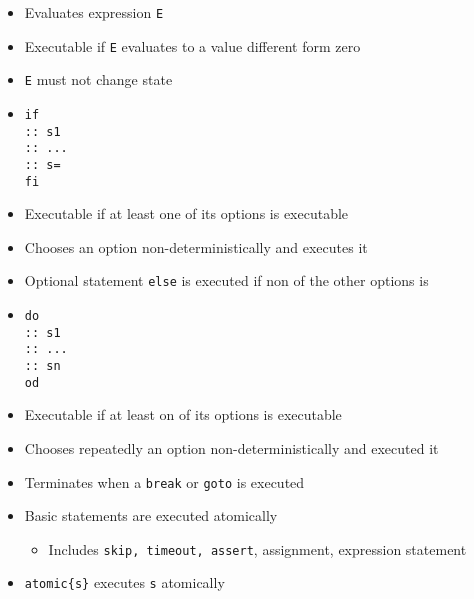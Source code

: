 \begin{itemize}
\begin{itemize}
                \begin{itemize}
                    \item Evaluates expression \verb+E+
                    \item Executable if \verb+E+ evaluates to a value different form zero
                    \item \verb+E+ must not change state
                \end{itemize}
                \begin{itemize}
                    \item
\begin{verbatim}
if
:: s1
:: ...
:: s=
fi
\end{verbatim}
                    \item Executable if at least one of its options is executable
                    \item Chooses an option non-deterministically and executes it
                    \item Optional statement \verb+else+ is executed if non of the other options is
                \end{itemize}
                \begin{itemize}
                    \item
\begin{verbatim}
do
:: s1
:: ...
:: sn
od
\end{verbatim}
                    \item Executable if at least on of its options is executable
                    \item Chooses repeatedly an option non-deterministically and executed it
                    \item Terminates when a \verb+break+ or \verb+goto+ is executed
                \end{itemize}
                \begin{itemize}
                    \item Basic statements are executed atomically
                        \begin{itemize}
                            \item Includes \verb+skip, timeout, assert+, assignment, expression statement
                        \end{itemize}
                    \item \verb+atomic{s}+ executes \verb+s+ atomically

\end{itemize}
\end{itemize}
\end{itemize}
